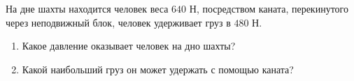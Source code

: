 На дне шахты находится человек веса $640$ Н, посредством каната,
перекинутого через неподвижный блок, человек удерживает груз в $480$ Н.
\begin{enumerate}
\item Какое давление оказывает человек на дно шахты?
\item Какой наибольший груз он может удержать с помощью каната?
\end{enumerate}
